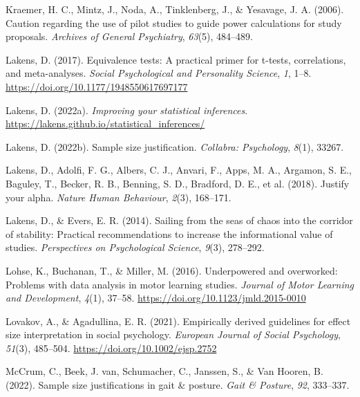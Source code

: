 \documentclass[
  man, donotrepeattitle,mask,floatsintext]{apa7}
\newlength{\cslhangindent}
\newlength{\cslentryspacingunit} %
\newenvironment{CSLReferences}[2] %
 {%
  \setlength{\parindent}{0pt}
  \ifodd #1
  \let\oldpar\par
  \def\par{\hangindent=\cslhangindent\oldpar}
  \fi
  \setlength{\parskip}{#2\cslentryspacingunit}
 }%
 {}
\begin{document}
\begin{CSLReferences}{1}{0}
\leavevmode{}%
Kraemer, H. C., Mintz, J., Noda, A., Tinklenberg, J., \& Yesavage, J. A. (2006). Caution regarding the use of pilot studies to guide power calculations for study proposals. \emph{Archives of General Psychiatry}, \emph{63}(5), 484--489.

\leavevmode{}%
Lakens, D. (2017). Equivalence tests: A practical primer for t-tests, correlations, and meta-analyses. \emph{Social Psychological and Personality Science}, \emph{1}, 1--8. \url{https://doi.org/10.1177/1948550617697177}

\leavevmode{}%
Lakens, D. (2022a). \emph{Improving your statistical inferences}. \url{https://lakens.github.io/statistical_inferences/}

\leavevmode{}%
Lakens, D. (2022b). Sample size justification. \emph{Collabra: Psychology}, \emph{8}(1), 33267.

\leavevmode{}%
Lakens, D., Adolfi, F. G., Albers, C. J., Anvari, F., Apps, M. A., Argamon, S. E., Baguley, T., Becker, R. B., Benning, S. D., Bradford, D. E., et al. (2018). Justify your alpha. \emph{Nature Human Behaviour}, \emph{2}(3), 168--171.

\leavevmode{}%
Lakens, D., \& Evers, E. R. (2014). Sailing from the seas of chaos into the corridor of stability: Practical recommendations to increase the informational value of studies. \emph{Perspectives on Psychological Science}, \emph{9}(3), 278--292.

\leavevmode{}%
Lohse, K., Buchanan, T., \& Miller, M. (2016). Underpowered and overworked: Problems with data analysis in motor learning studies. \emph{Journal of Motor Learning and Development}, \emph{4}(1), 37--58. \url{https://doi.org/10.1123/jmld.2015-0010}

\leavevmode{}%
Lovakov, A., \& Agadullina, E. R. (2021). Empirically derived guidelines for effect size interpretation in social psychology. \emph{European Journal of Social Psychology}, \emph{51}(3), 485--504. \url{https://doi.org/10.1002/ejsp.2752}

\leavevmode{}%
McCrum, C., Beek, J. van, Schumacher, C., Janssen, S., \& Van Hooren, B. (2022). Sample size justifications in gait \& posture. \emph{Gait \& Posture}, \emph{92}, 333--337.


\end{CSLReferences}
\end{document}
